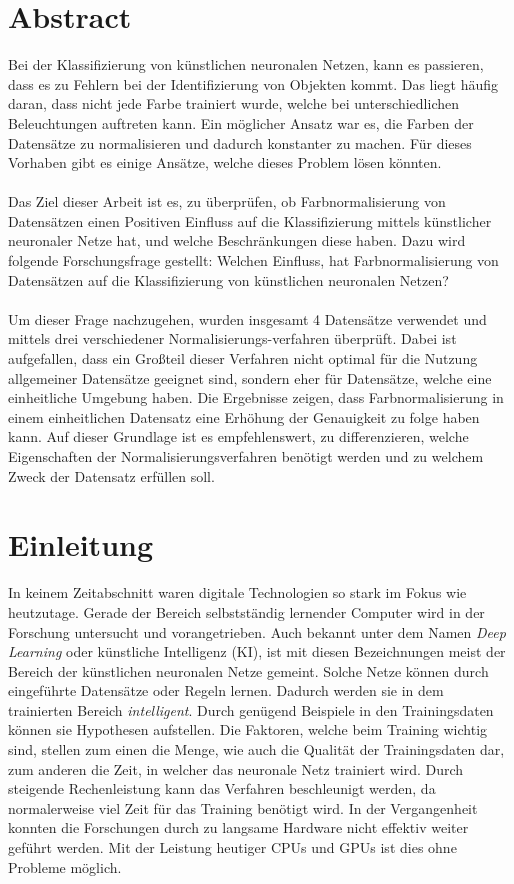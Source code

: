 \documentclass[a4paper,12pt,oneside]{article}
\begin{document}
  \section*{Abstract}
Bei der Klassifizierung von künstlichen neuronalen Netzen, kann es passieren, dass es zu Fehlern bei der Identifizierung von Objekten kommt. Das liegt häufig daran, dass nicht jede Farbe trainiert wurde, welche bei unterschiedlichen Beleuchtungen auftreten kann. Ein möglicher Ansatz war es, die Farben der Datensätze zu normalisieren und dadurch konstanter zu machen. Für dieses Vorhaben gibt es einige Ansätze, welche dieses Problem lösen könnten.\\\\
Das Ziel dieser Arbeit ist es, zu überprüfen, ob Farbnormalisierung von Datensätzen einen Positiven Einfluss auf die Klassifizierung mittels künstlicher neuronaler Netze hat, und welche Beschränkungen diese haben. Dazu wird folgende Forschungsfrage gestellt: Welchen Einfluss, hat Farbnormalisierung von Datensätzen auf die Klassifizierung von künstlichen neuronalen Netzen? \\\\
Um dieser Frage nachzugehen, wurden insgesamt 4 Datensätze verwendet und mittels drei verschiedener Normalisierungs-verfahren überprüft. Dabei ist aufgefallen, dass ein Großteil dieser Verfahren nicht optimal für die Nutzung allgemeiner Datensätze geeignet sind, sondern eher für Datensätze, welche eine einheitliche Umgebung haben. Die Ergebnisse zeigen, dass Farbnormalisierung in einem einheitlichen Datensatz eine Erhöhung der Genauigkeit zu folge haben kann. Auf dieser Grundlage ist es empfehlenswert, zu differenzieren, welche Eigenschaften der Normalisierungsverfahren benötigt werden und zu welchem Zweck der Datensatz erfüllen soll.
  \newpage
  \tableofcontents
  \newpage
  \listoffigures
  \newpage
  \listoftables
  \newpage
  \section{Einleitung}\label{s.einleitung} 
In keinem Zeitabschnitt waren digitale Technologien so stark im Fokus wie heutzutage. Gerade der Bereich selbstständig lernender Computer wird in der Forschung untersucht und vorangetrieben. Auch bekannt unter dem Namen \textit{Deep Learning} oder künstliche Intelligenz (KI), ist mit diesen Bezeichnungen meist der Bereich der künstlichen neuronalen Netze gemeint. Solche Netze können durch eingeführte Datensätze oder Regeln lernen. Dadurch werden sie in dem trainierten Bereich \textit{intelligent}. Durch genügend Beispiele in den Trainingsdaten können sie Hypothesen aufstellen. Die Faktoren, welche beim Training wichtig sind, stellen zum einen die Menge, wie auch die Qualität der Trainingsdaten dar, zum anderen die Zeit, in welcher das neuronale Netz trainiert wird. Durch steigende Rechenleistung kann das Verfahren beschleunigt werden, da normalerweise viel Zeit für das Training benötigt wird. In der Vergangenheit konnten die Forschungen durch zu langsame Hardware nicht effektiv weiter geführt werden. Mit der Leistung heutiger CPUs und GPUs ist dies ohne Probleme möglich.\\ 
\end{document}
